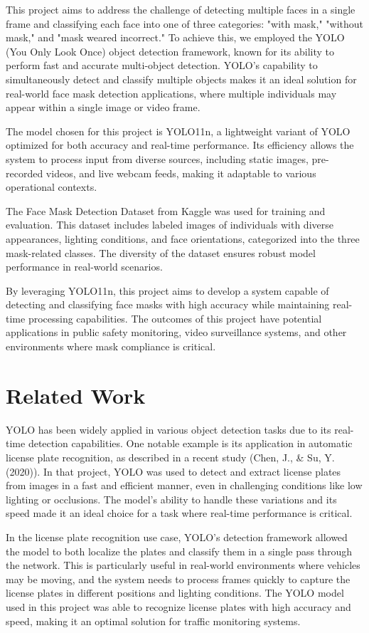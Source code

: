 \documentclass[11pt]{article}
\begin{document}
This project aims to address the challenge of detecting multiple faces in a single frame and classifying each face into one of three categories: "with mask," "without mask," and "mask weared incorrect." To achieve this, we employed the YOLO (You Only Look Once) object detection framework, known for its ability to perform fast and accurate multi-object detection. YOLO’s capability to simultaneously detect and classify multiple objects makes it an ideal solution for real-world face mask detection applications, where multiple individuals may appear within a single image or video frame.

The model chosen for this project is YOLO11n, a lightweight variant of YOLO optimized for both accuracy and real-time performance. Its efficiency allows the system to process input from diverse sources, including static images, pre-recorded videos, and live webcam feeds, making it adaptable to various operational contexts.

The Face Mask Detection Dataset from Kaggle was used for training and evaluation. This dataset includes labeled images of individuals with diverse appearances, lighting conditions, and face orientations, categorized into the three mask-related classes. The diversity of the dataset ensures robust model performance in real-world scenarios.

By leveraging YOLO11n, this project aims to develop a system capable of detecting and classifying face masks with high accuracy while maintaining real-time processing capabilities. The outcomes of this project have potential applications in public safety monitoring, video surveillance systems, and other environments where mask compliance is critical.

\section{Related Work}

YOLO has been widely applied in various object detection tasks due to its real-time detection capabilities. One notable example is its application in automatic license plate recognition, as described in a recent study (Chen, J., \& Su, Y. (2020)). In that project, YOLO was used to detect and extract license plates from images in a fast and efficient manner, even in challenging conditions like low lighting or occlusions. The model's ability to handle these variations and its speed made it an ideal choice for a task where real-time performance is critical.

In the license plate recognition use case, YOLO’s detection framework allowed the model to both localize the plates and classify them in a single pass through the network. This is particularly useful in real-world environments where vehicles may be moving, and the system needs to process frames quickly to capture the license plates in different positions and lighting conditions. The YOLO model used in this project was able to recognize license plates with high accuracy and speed, making it an optimal solution for traffic monitoring systems.
\end{document}
